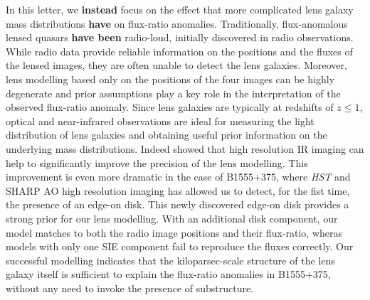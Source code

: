 \documentclass[useAMS,usenatbib]{mn2e}
\begin{document}
In this letter, we \textbf{instead} focus on the effect that more complicated lens galaxy mass
distributions \textbf{have} on flux-ratio anomalies.
Traditionally, flux-anomalous lensed quasars \textbf{have been} radio-loud, initially discovered in radio observations. While radio data
provide reliable information on the positions and the fluxes of the
lensed images, they are often unable to detect the lens
galaxies. Moreover, lens modelling based only on the positions of the
four images can be highly degenerate and prior assumptions play a key
role in the interpretation of the observed flux-ratio anomaly.  Since
lens galaxies are typically at redshifts of $z \leq 1$, optical and
near-infrared observations are ideal for measuring the light distribution
of lens galaxies and obtaining useful prior information on the underlying
mass distributions. Indeed \citet{SHARP12} showed that high
resolution IR imaging can help to significantly improve the precision
of the lens modelling. This improvement is even more dramatic in the
case of B1555+375, where \textit{HST} and SHARP AO high resolution imaging has
allowed us to detect, for the fist time, the presence of an edge-on
disk. This newly discovered edge-on disk provides a strong prior for our
lens modelling.  With an additional disk component, our model 
matches to both the radio image positions and their flux-ratio, wheras
models with only one SIE component \citep{Marlow99,Xu14} fail to
reproduce the fluxes correctly. Our successful modelling indicates
that the kiloparsec-scale structure of the lens galaxy itself is
sufficient to explain the flux-ratio anomalies in B1555+375, without
any need to invoke the presence of substructure.
\end{document}
